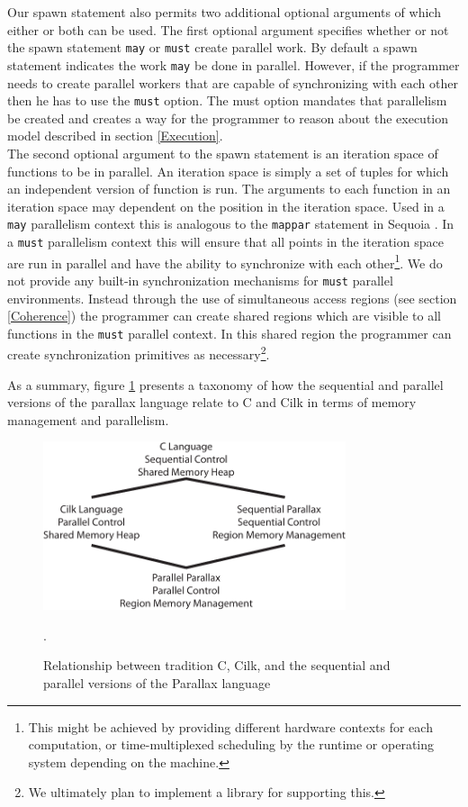 \documentclass{article}
\theoremstyle{definition}
\begin{document}
\noindent
Our spawn statement also permits two additional optional arguments of which either
or both can be used.  The first optional argument specifies whether or not the
spawn statement {\tt may} or {\tt must} create parallel work.  By default a spawn
statement indicates the work {\tt may} be done in parallel.  However, if the programmer
needs to create parallel workers that are capable of synchronizing with each other
then he has to use the {\tt must} option.  The must option mandates that parallelism be
created and creates a way for the programmer to reason about the execution model
described in section \ref{Execution}. \\

\noindent
The second optional argument to the spawn statement is an iteration space of functions
to be in parallel.  An iteration space is simply a set of tuples for which an 
independent version of function is run.  The arguments to each function in an 
iteration space may dependent on the position in the iteration space.
Used in a {\tt may} parallelism context this is analogous to the {\tt mappar} 
statement in Sequoia \cite{Fatahalian06}.  In a {\tt must} parallelism context
this will ensure that all points in the iteration space are run in parallel and
have the ability to synchronize with each other\footnote{This might be achieved
by providing different hardware contexts for each computation, or time-multiplexed
scheduling by the runtime or operating system depending on the machine.}.  We
do not provide any built-in synchronization mechanisms for {\tt must} parallel
environments.  Instead through the use of simultaneous access regions (see section
\ref{Coherence}) the programmer can create shared regions which are visible to
all functions in the {\tt must} parallel context.  In this shared region the programmer
can create synchronization primitives as necessary\footnote{We ultimately plan to
implement a library for supporting this.}. 

\noindent
As a summary, figure \ref{fig:taxonomy} presents a taxonomy of how the sequential
and parallel versions of the parallax language relate to C and Cilk in terms
of memory management and parallelism.

\begin{figure}[t]
\centering
\includegraphics[width=3.5in]{figs/Taxonomy.pdf}
\caption{Relationship between tradition C, Cilk, and the sequential and
parallel versions of the Parallax language \label{fig:taxonomy}}.
\end{figure}
\end{document}
